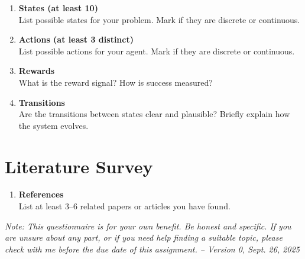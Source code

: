 \documentclass[12pt,a4paper]{article}
\begin{document}
\begin{enumerate}[resume]
    \item \textbf{States (at least 10)} \\[3pt]
    List possible states for your problem. Mark if they are discrete or continuous.  
    \begin{tcolorbox}[height=7cm]
    \end{tcolorbox}

    \item \textbf{Actions (at least 3 distinct)} \\[3pt]
    List possible actions for your agent. Mark if they are discrete or continuous.  
    \begin{tcolorbox}[height=5cm]
    \end{tcolorbox}
    
\clearpage
    \item \textbf{Rewards} \\[3pt]
    What is the reward signal? How is success measured?  
    \begin{tcolorbox}[height=5cm]
    \end{tcolorbox}

    \item \textbf{Transitions} \\[3pt]
    Are the transitions between states clear and plausible? Briefly explain how the system evolves.  
    \begin{tcolorbox}[height=5cm]
    \end{tcolorbox}
\end{enumerate}

\section*{Literature Survey}

\begin{enumerate}[resume]

    \item \textbf{References} \\[3pt]
    List at least 3--6 related papers or articles you have found.  
    \begin{tcolorbox}[height=5cm]
    \end{tcolorbox}

\end{enumerate}

\vfill
\noindent
\textit{Note: This questionnaire is for your own benefit. Be honest and specific. 
If you are unsure about any part, or if you need help finding a suitable topic, 
please check with me before the due date of this assignment.  -- Version 0, Sept. 26, 2025}
\end{document}
